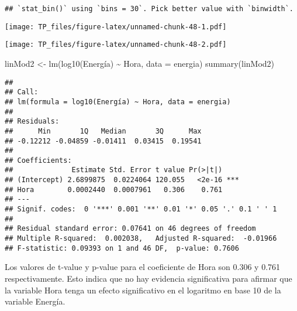 \documentclass[
]{article}
\newenvironment{Shaded}{\begin{snugshade}}{\end{snugshade}}
\newcommand{\AttributeTok}[1]{\textcolor[rgb]{0.77,0.63,0.00}{#1}}
\newcommand{\CommentTok}[1]{\textcolor[rgb]{0.56,0.35,0.01}{\textit{#1}}}
\newcommand{\FunctionTok}[1]{\textcolor[rgb]{0.00,0.00,0.00}{#1}}
\newcommand{\NormalTok}[1]{#1}
\newcommand{\OtherTok}[1]{\textcolor[rgb]{0.56,0.35,0.01}{#1}}
\newcommand{\SpecialCharTok}[1]{\textcolor[rgb]{0.00,0.00,0.00}{#1}}
\begin{document}
\begin{verbatim}
## `stat_bin()` using `bins = 30`. Pick better value with `binwidth`.
\end{verbatim}

\texttt{[image: TP\_files/figure-latex/unnamed-chunk-48-1.pdf]}

\begin{Shaded}
\end{Shaded}

\texttt{[image: TP\_files/figure-latex/unnamed-chunk-48-2.pdf]}

\begin{Shaded}
\begin{Highlighting}[]
\NormalTok{linMod2 }\OtherTok{\textless{}{-}} \FunctionTok{lm}\NormalTok{(}\FunctionTok{log10}\NormalTok{(Energía) }\SpecialCharTok{\textasciitilde{}}\NormalTok{ Hora, }\AttributeTok{data =}\NormalTok{ energia)}
\FunctionTok{summary}\NormalTok{(linMod2)}
\end{Highlighting}
\end{Shaded}

\begin{verbatim}
## 
## Call:
## lm(formula = log10(Energía) ~ Hora, data = energia)
## 
## Residuals:
##      Min       1Q   Median       3Q      Max 
## -0.12212 -0.04859 -0.01411  0.03415  0.19541 
## 
## Coefficients:
##              Estimate Std. Error t value Pr(>|t|)    
## (Intercept) 2.6899875  0.0224064 120.055   <2e-16 ***
## Hora        0.0002440  0.0007961   0.306    0.761    
## ---
## Signif. codes:  0 '***' 0.001 '**' 0.01 '*' 0.05 '.' 0.1 ' ' 1
## 
## Residual standard error: 0.07641 on 46 degrees of freedom
## Multiple R-squared:  0.002038,   Adjusted R-squared:  -0.01966 
## F-statistic: 0.09393 on 1 and 46 DF,  p-value: 0.7606
\end{verbatim}

Los valores de t-value y p-value para el coeficiente de Hora son 0.306 y
0.761 respectivamente. Esto indica que no hay evidencia significativa
para afirmar que la variable Hora tenga un efecto significativo en el
logaritmo en base 10 de la variable Energía.
\end{document}
